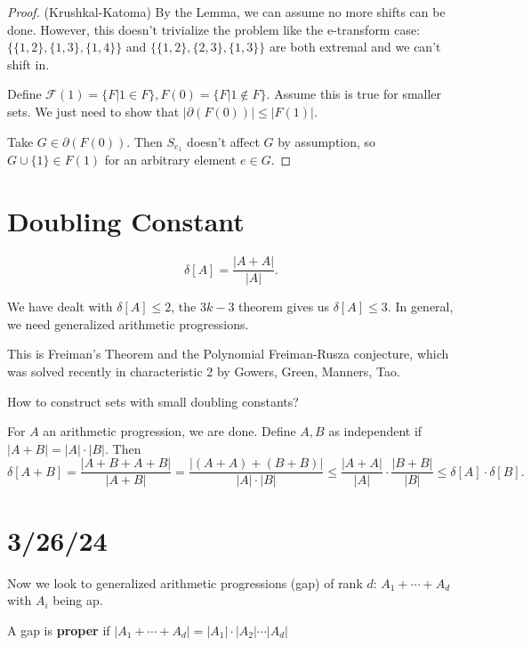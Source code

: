 \documentclass[a4paper]{article}
\begin{document}
\begin{proof}(Krushkal-Katoma)
	By the Lemma, we can assume no more shifts can be done.
	However, this doesn't trivialize the problem like the e-transform case: $\{\{1,2\} ,\{1,3\} ,\{1,4\}    \}   $ and $\{\{1,2\} ,\{2,3\} ,\{1,3\}    \}   $ are both extremal and we can't shift in.

	Define $\mathcal{F}(1) = \{F \vert 1 \in F\} , F(0) = \{F | 1 \not\in F\}    $.
	Assume this is true for smaller sets.
	We just need to show that $|\partial(F(0))| \le |F(1)|$.

	Take $G \in \partial(F(0)) $.
	Then $S_{e_{1}} $ doesn't affect $G $ by assumption, so $G \cup \{1\} \in F(1)	$ for an arbitrary element $e \in G $.
\end{proof}

\section{Doubling Constant}

\begin{definition}
	\[
	\delta[A] = \frac{|A+A|}{|A|}
	.\]
\end{definition}

We have dealt with $\delta[A] \le 2 $, the $3k-3 $ theorem gives us $\delta[A] \le 3 $.
In general, we need generalized arithmetic progressions.

This is Freiman's Theorem and the Polynomial Freiman-Rusza conjecture, which was solved recently in characteristic 2 by Gowers, Green, Manners, Tao.

How to construct sets with small doubling constants?

For $A $ an arithmetic progression, we are done.
Define $A,B $ as independent if $|A+B| = |A|\cdot |B|$.
Then
\[
	\delta[A+B] = \frac{|A+B+A+B|}{|A+B|} = \frac{|(A+A)+(B+B)|}{|A|\cdot|B|} \le \frac{|A+A|}{|A|} \cdot \frac{|B+B|}{|B|} \le \delta[A] \cdot \delta[B]
.\]

\section{3/26/24}

Now we look to generalized arithmetic progressions (gap) of rank $d $: $A_{1} + \cdots + A_d $ with $A_i $ being ap.

\begin{definition}
	A gap is \textbf{proper} if $|A_{1}+\cdots+A_d| = |A_{1}|\cdot|A_{2}|\cdots |A_d| $
\end{definition}
\end{document}
